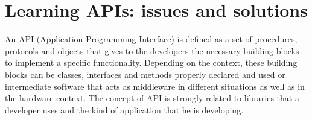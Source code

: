 
\section{Learning APIs: issues and solutions}

An API (Application Programming Interface) is defined as a set of procedures, 
protocols and objects that gives to the developers the necessary building 
blocks to implement a specific functionality. Depending on the context, these 
building blocks can be classes, interfaces and methods properly declared and 
used or intermediate software that acts as middleware in different situations 
as well as in the hardware context. The concept of API is strongly related to 
libraries that a developer uses and the kind of application that he is 
developing. 

